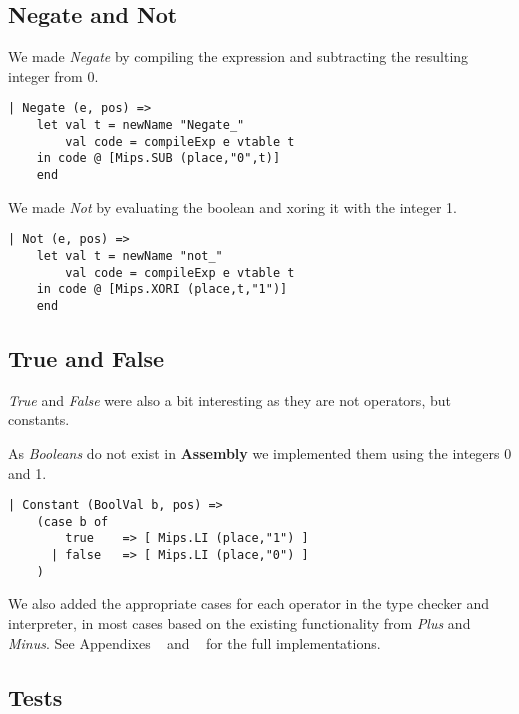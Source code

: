 \documentclass{article}
\begin{document}
\subsection{Negate and Not}
We made \textit{Negate} by compiling the expression and subtracting the resulting integer from 0.
\begin{lstlisting}
| Negate (e, pos) =>
    let val t = newName "Negate_"
        val code = compileExp e vtable t
    in code @ [Mips.SUB (place,"0",t)]
    end
\end{lstlisting}
We made \textit{Not} by evaluating the boolean and xoring it with the integer 1.
\begin{lstlisting}
| Not (e, pos) =>
    let val t = newName "not_"
        val code = compileExp e vtable t
    in code @ [Mips.XORI (place,t,"1")]
    end
\end{lstlisting}

\subsection{True and False}
\textit{True} and \textit{False} were also a bit interesting as they are not operators, but constants.

\noindent As \textit{Booleans} do not exist in \textbf{Assembly} we implemented them using the integers 0 and 1.
\begin{lstlisting}
| Constant (BoolVal b, pos) => 
    (case b of
        true    => [ Mips.LI (place,"1") ]
      | false   => [ Mips.LI (place,"0") ]
    )
\end{lstlisting}

We also added the appropriate cases for each operator in the type checker and interpreter, in most cases based on the existing functionality from \textit{Plus} and \textit{Minus}.
See Appendixes ~ and ~ for the full implementations.

\subsection{Tests}
\end{document}
